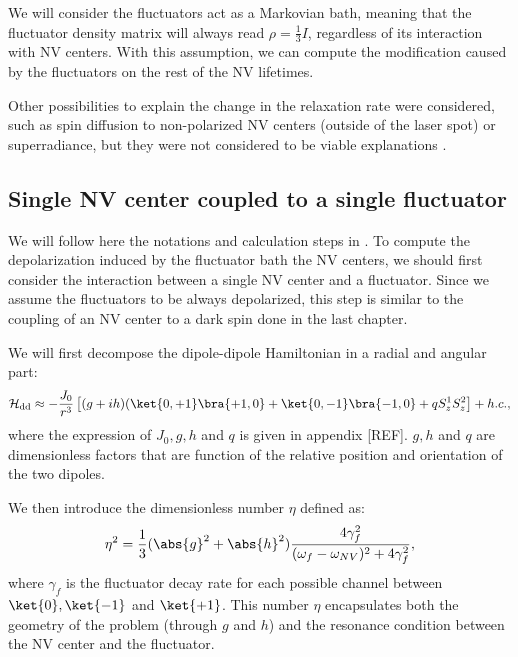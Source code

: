 \documentclass[a4paper,11pt]{report}
\begin{document}
\begin{refsection}
We will consider the fluctuators act as a Markovian bath, meaning that the fluctuator density matrix will always read $\rho = \frac{1}{3} I$, regardless of its interaction with NV centers. With this assumption, we can compute the modification caused by the fluctuators on the rest of the NV lifetimes.

Other possibilities to explain the change in the relaxation rate were considered, such as spin diffusion to non-polarized NV centers (outside of the laser spot) or superradiance, but they were not considered to be viable explanations \citep{choi2017depolarization}.

\subsection{Single NV center coupled to a single fluctuator}
We will follow here the notations and calculation steps in \citep{choi2017depolarization}. To compute the depolarization induced by the fluctuator bath the NV centers, we should first consider the interaction between a single NV center and a fluctuator. Since we assume the fluctuators to be always depolarized, this step is similar to the coupling of an NV center to a dark spin done in the last chapter.

We will first decompose the dipole-dipole Hamiltonian in a radial and angular part:
\begin{equation}
\mathcal{H}_{\rm dd} \approx - \frac{J_0}{r^3} \left[(g+ih)(\ket{0,+1}\bra{+1,0}+\ket{0,-1}\bra{-1,0}+qS_z^1 S_z^2 \right] + h.c. ,
\end{equation}
where the expression of $J_0, g, h$ and $q$ is given in appendix [REF]. $g, h$ and $q$ are dimensionless factors that are function of the relative position and orientation of the two dipoles.

We then introduce the dimensionless number $\eta$ defined as:
\begin{equation}
\label{eq eta}
\eta^2=\frac{1}{3} (\abs{g}^2+\abs{h}^2)  \frac{4\gamma_f^2}{(\omega_f - \omega_{NV})^2+4\gamma_f^2},
\end{equation}
where $\gamma_f$ is the fluctuator decay rate for each possible channel between $\ket{0}, \ket{-1}$ and $\ket{+1}$. This number $\eta$ encapsulates both the geometry of the problem (through $g$ and $h$) and the resonance condition between the NV center and the fluctuator.


\end{refsection}
\end{document}
